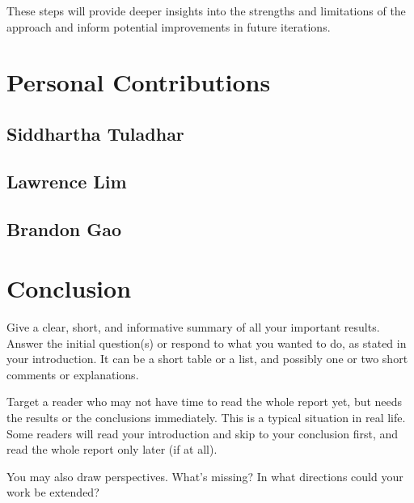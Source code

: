 \documentclass{scrartcl}
\begin{document}
These steps will provide deeper insights into the strengths and limitations of the approach and inform potential improvements in future iterations.


\section{Personal Contributions}

\subsection{Siddhartha Tuladhar}

\subsection{Lawrence Lim}

\subsection{Brandon Gao}

\section{Conclusion}

Give a clear, short, and informative summary of all your important results. Answer the initial question(s) or respond to what you wanted to do, as stated in your introduction. It can be a short table or a list, and possibly one or two short comments or explanations. 

Target a reader who may not have time to read the whole report yet, but needs the results or the conclusions immediately. This is a typical situation in real life. Some readers will read your introduction and skip to your conclusion first, and read the whole report only later (if at all).

You may also draw perspectives. What's missing? In what directions could your work be extended?

\newpage
\singlespacing




\end{document}
